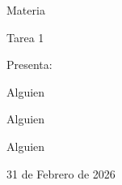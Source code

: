 \begin{titlepage}
	\centering
	\vspace*{0.5cm}
	
	{\Huge Materia\par}
	
	\vspace*{0.5cm}
	
	{\LARGE Tarea 1}\\
	
	\vfill
	{\Large Presenta:\par}
	{\Large Alguien\par}
	{\Large Alguien\par}
	{\Large Alguien\par}
	\vspace*{1cm}
	{\large 31 de Febrero de 2026\par}
\end{titlepage}